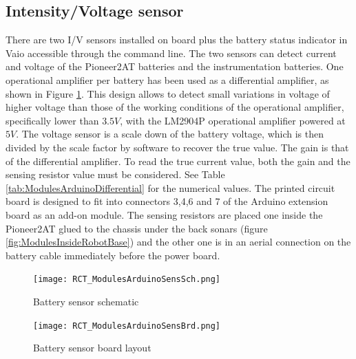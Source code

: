 \subsection{Intensity/Voltage sensor}
There are two I/V sensors installed on board plus the battery status
indicator in Vaio accessible through the command line.
The two sensors can detect current and voltage of the Pioneer2AT batteries and
the instrumentation batteries. One operational amplifier per
battery has been used as a differential amplifier, as shown in Figure
\ref{fig:ModulesArduinoSensSch}. This design allows to detect small variations
in voltage of higher voltage than those of the working conditions of the
operational amplifier, specifically lower than $3.5V$, with the LM2904P
operational amplifier powered at $5V$. The voltage sensor is a scale down of the battery
voltage, which is then divided by the scale factor by software to recover the
true value. The gain is that of the differential amplifier. To read the
true current value, both the gain and the sensing resistor value must be
considered. See Table \ref{tab:ModulesArduinoDifferential} for the numerical values.
The printed circuit board is designed to fit into connectors 3,4,6 and 7 of the
Arduino extension board as an add-on module. The sensing resistors are placed
one inside the Pioneer2AT glued to the chassis under the back sonars
(figure \ref{fig:ModulesInsideRobotBase}) and the other one is in an aerial connection
on the battery cable immediately before the power board.


\begin{figure}[htbp]
\begin{center}
 {\texttt{[image: RCT\_ModulesArduinoSensSch.png]}}
\end{center}
\caption{Battery sensor schematic}
\label{fig:ModulesArduinoSensSch}
\end{figure}


\begin{figure}[htbp]
\begin{center}
 {\texttt{[image: RCT\_ModulesArduinoSensBrd.png]}}
\end{center}
\caption{Battery sensor board layout}
\label{fig:ModulesArduinoSensBrd}
\end{figure}

